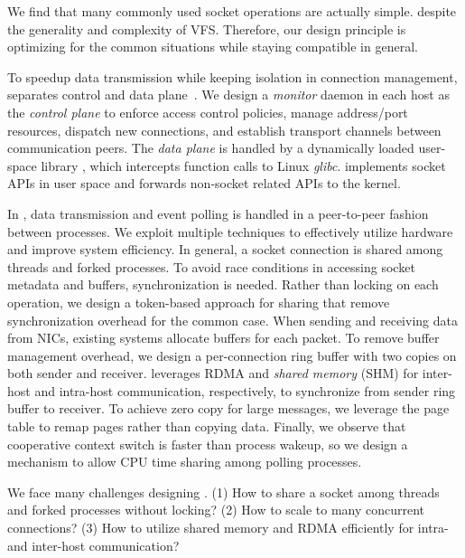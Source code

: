 We find that many commonly used socket operations are actually simple. despite the generality and complexity of VFS. Therefore, our design principle is optimizing for the common situations while staying compatible in general.

To speedup data transmission while keeping isolation in connection management, \sys{} separates control and data plane~\cite{peter2016arrakis}.
We design a \emph{monitor} daemon in each host as the \emph{control plane} to enforce access control policies, manage address/port resources, dispatch new connections, and establish transport channels between communication peers.
The \emph{data plane} is handled by a dynamically loaded user-space library \libipc{}, which intercepts function calls to Linux \emph{glibc}. \libipc{} implements socket APIs in user space and forwards non-socket related APIs to the kernel.


In \sys{}, data transmission and event polling is handled in a peer-to-peer fashion between processes.
We exploit multiple techniques to effectively utilize hardware and improve system efficiency.
In general, a socket connection is shared among threads and forked processes.
To avoid race conditions in accessing socket metadata and buffers, synchronization is needed. Rather than locking on each operation, we design a token-based approach for sharing that remove synchronization overhead for the common case.
When sending and receiving data from NICs, existing systems allocate buffers for each packet.
To remove buffer management overhead, we design a per-connection ring buffer with two copies on both sender and receiver.
\sys{} leverages RDMA and \emph{shared memory} (SHM) for inter-host and intra-host communication, respectively, to synchronize from sender ring buffer to receiver.
To achieve zero copy for large messages, we leverage the page table to remap pages rather than copying data.
Finally, we observe that cooperative context switch is faster than process wakeup, so we design a mechanism to allow CPU time sharing among polling processes.

\iffalse

We face many challenges designing \sys{}. 
(1) How to share a socket among threads and forked processes without locking?
(2) How to scale to many concurrent connections?
(3) How to utilize shared memory and RDMA efficiently for intra- and inter-host communication?

